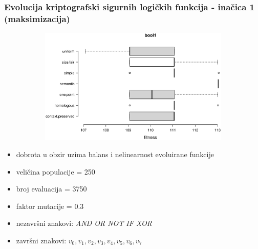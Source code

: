 \documentclass{beamer}
\begin{document}
\begin{frame}
\frametitle{Evolucija kriptografski sigurnih logičkih funkcija - inačica 1
 (maksimizacija)}


\begin{figure}[!htb]
\begin{figure}[H]
	\centering
	\includegraphics[trim=3cm 5.5cm 0cm 3.5cm, scale=0.27]{./boxPlots/bool1.eps}
\end{figure}
\endminipage
{}
\endminipage
\end{figure}

\begin{itemize}
\item{dobrota u obzir uzima balans i nelinearnost evoluirane funkcije}
\item{veličina populacije = 250}
\item{broj evaluacija = 3750}
\item{faktor mutacije = 0.3}
\item{nezavršni znakovi: \textit{AND OR NOT IF XOR}}
\item{završni znakovi: \textit{$v_0, v_1, v_2, v_3, v_4, v_5, v_6, v_7$}}
\end{itemize}
\end{frame}
\end{document}

